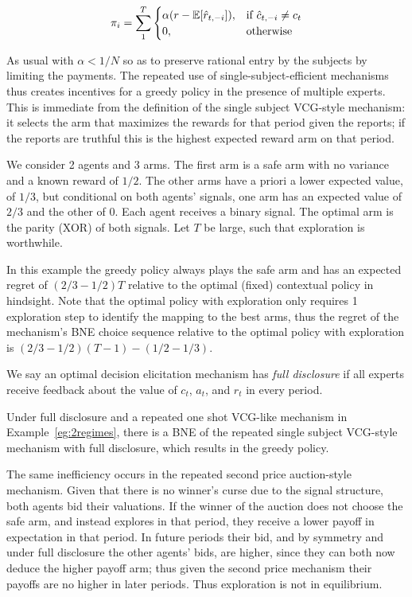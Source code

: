 \[
    \pi_i = \sum_1^T 
\begin{cases}
    \alpha (r - \expec[\hat{r}_{t,-i}]) ,& \text{if } \hat{c}_{t,-i} \neq c_t\\
    0,              & \text{otherwise}
\end{cases}
\]

As usual with $\alpha < 1/N$ so as to preserve rational entry by the subjects by limiting the payments.
The repeated use of single-subject-efficient mechanisms thus creates incentives for a greedy policy in the presence of multiple experts.
This is immediate from the definition of the single subject VCG-style mechanism: it selects the arm that maximizes the rewards for that period given the reports; if the reports are truthful this is the highest expected reward arm on that period.


\begin{eg}\label{eg:2regimes}
We consider 2 agents and 3 arms. The first arm is a safe arm with no variance and a known reward of $1/2$. The other arms have a priori a lower expected value, of $1/3$, but conditional on both agents' signals, one arm has an expected value of $2/3$ and the other of $0$. 
Each agent receives a binary signal. The optimal arm is the parity (XOR) of both signals. Let $T$ be large, such that exploration is worthwhile.
\end{eg}

In this example the greedy policy always plays the safe arm and has an expected regret of $(2/3 - 1/2)T$ relative to the optimal (fixed) contextual policy in hindsight.
Note that the optimal policy with exploration only requires 1 exploration step to identify the mapping to the best arms, thus the regret of the mechanism's BNE choice sequence relative to the optimal policy with exploration is $(2/3 - 1/2)(T-1) - (1/2-1/3) $. 

\begin{defn}
  We say an optimal decision elicitation mechanism has \emph{full disclosure} if all experts receive feedback about the value of $c_t$, $a_t$, and $r_t$ in every period.
 \end{defn}


Under full disclosure and a repeated one shot VCG-like mechanism in Example~\ref{eg:2regimes}, there is a BNE of the repeated single subject VCG-style mechanism with full disclosure, which results in the greedy policy.

The same inefficiency occurs in the repeated second price auction-style mechanism.
Given that there is no winner's curse due to the signal structure, both agents bid their valuations. If the winner of the auction does not choose the safe arm, and instead explores in that period, they receive a lower payoff in expectation in that period. In future periods their bid, and by symmetry and under full disclosure the other agents' bids, are higher, since they can both now deduce the higher payoff arm; thus given the second price mechanism their payoffs are no higher in later periods. Thus exploration is not in equilibrium. 

